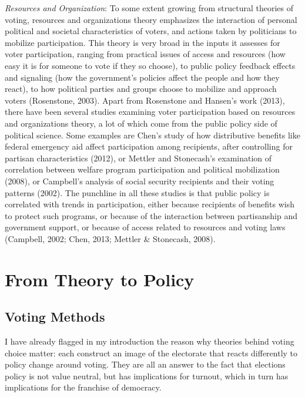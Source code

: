 \documentclass[12pt,twoside]{reedthesis}
\begin{document}
\begin{itemize}
    \emph{Resources and Organization}: To some extent growing from
    structural theories of voting, resources and organizations theory
    emphasizes the interaction of personal political and societal
    characteristics of voters, and actions taken by politicians to
    mobilize participation. This theory is very broad in the inputs it
    assesses for voter participation, ranging from practical issues of
    access and resources (how easy it is for someone to vote if they so
    choose), to public policy feedback effects and signaling (how the
    government's policies affect the people and how they react), to how
    political parties and groups choose to mobilize and approach voters
    (Rosenstone, 2003). Apart from Rosenstone and Hansen's work (2013),
    there have been several studies examining voter participation based on
    resources and organizations theory, a lot of which come from the
    public policy side of political science. Some examples are Chen's
    study of how distributive benefits like federal emergency aid affect
    participation among recipients, after controlling for partisan
    characteristics (2012), or Mettler and Stonecash's examination of
    correlation between welfare program participation and political
    mobilization (2008), or Campbell's analysis of social security
    recipients and their voting patterns (2002). The punchline in all
    these studies is that public policy is correlated with trends in
    participation, either because recipients of benefits wish to protect
    such programs, or because of the interaction between partisanship and
    government support, or because of access related to resources and
    voting laws (Campbell, 2002; Chen, 2013; Mettler \& Stonecash, 2008).
  \end{itemize}
  
  \section{From Theory to Policy}\label{from-theory-to-policy}
  
  \subsection{Voting Methods}\label{voting-methods}
  
  I have already flagged in my introduction the reason why theories behind
  voting choice matter: each construct an image of the electorate that
  reacts differently to policy change around voting. They are all an
  answer to the fact that elections policy is not value neutral, but has
  implications for turnout, which in turn has implications for the
  franchise of democracy.
  
\end{document}
